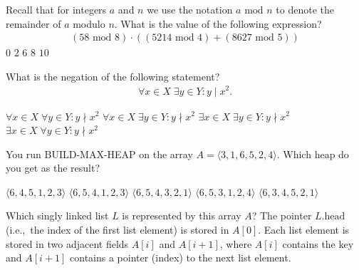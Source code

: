 Recall that for integers $a$ and $n$ we use the notation $a\text{ mod }n$ to denote the remainder of \(a\) modulo \(n\).
What is the value of the following expression?
\begin{align*}
  (58\text{ mod }8) \cdot \left((5214\text{ mod }4)+ (8627\text{ mod }5)\right)
\end{align*}
\oneanswer
\optionsstart
\answer \(0\)
\answer \(2\)
\answer \(6\)
\answer \(8\) \correct
\answer \(10\)
\optionsend
{}

What is the negation of the following statement?
\begin{align*}
  \forall x \in X \; \exists y \in Y : y \mid x^{2}.
\end{align*}
\oneanswer

\optionsstart
\answer \(\forall x \in X \; \forall y \in Y : y \nmid x^{2}\)
\answer \(\forall x \in X \; \exists y \in Y : y \nmid x^{2}\)
\answer \(\exists x \in X \; \exists y \in Y : y \nmid x^{2}\)
\answer \(\exists x \in X \; \forall y \in Y : y \nmid x^{2}\) \correct
\optionsend
{}

You run BUILD-MAX-HEAP on the array \(A = \langle 3, 1, 6, 5, 2, 4 \rangle\).
Which heap do you get as the result?
\oneanswer

\optionsstart
\answer \(\langle 6, 4, 5, 1, 2, 3 \rangle\)
\answer \(\langle 6, 5, 4, 1, 2, 3 \rangle\) \correct
\answer \(\langle 6, 5, 4, 3, 2, 1 \rangle\)
\answer \(\langle 6, 5, 3, 1, 2, 4 \rangle\)
\answer \(\langle 6, 3, 4, 5, 2, 1 \rangle\)
\optionsend
{}



Which singly linked list \(L\) is represented by this array \(A\)? The pointer \(L.\text{head}\) (i.e.,~the index of the first list element) is stored in \(A[0]\).
Each list element is stored in two adjacent fields \(A[i]\) and \(A[i+1]\), where \(A[i]\) contains
the key and \(A[i+1]\) contains a pointer (index) to the next list element.

